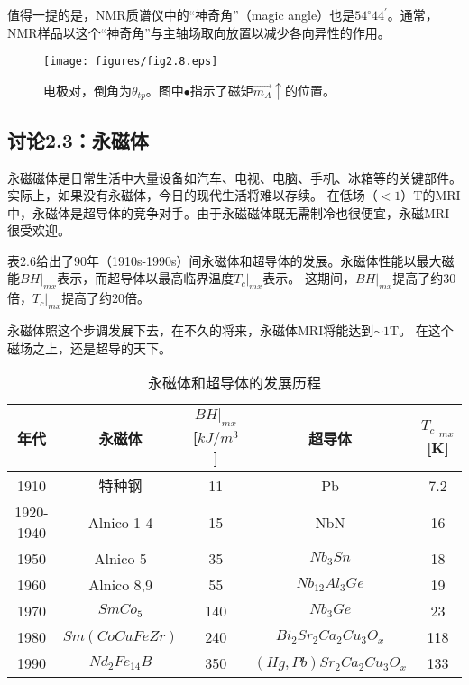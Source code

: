 值得一提的是，NMR质谱仪中的“神奇角”（magic angle）也是$54^\circ 44^\prime$。通常，NMR样品以这个“神奇角”与主轴场取向放置以减少各向异性的作用。

\begin{figure}
  \centering
 \texttt{[image: figures/fig2.8.eps]}
  \caption{电极对，倒角为$\theta_{tp}$。图中$\bullet$指示了磁矩$\vec{m_A}\uparrow$的位置。}
\end{figure}

\subsection{讨论2.3：永磁体}
永磁磁体是日常生活中大量设备如汽车、电视、电脑、手机、冰箱等的关键部件。实际上，如果没有永磁体，今日的现代生活将难以存续。
在低场（$<1$）T的MRI中，永磁体是超导体的竞争对手。由于永磁磁体既无需制冷也很便宜，永磁MRI很受欢迎。

表2.6给出了90年（1910s-1990s）间永磁体和超导体的发展。永磁体性能以最大磁能$BH|_{mx}$表示，而超导体以最高临界温度$T_c|_{mx}$表示。
这期间，$BH|_{mx}$提高了约30倍，$T_c|_{mx}$提高了约20倍。

永磁体照这个步调发展下去，在不久的将来，永磁体MRI将能达到$\sim 1$T。
在这个磁场之上，还是超导的天下。

\begin{table}[]
\centering
\caption{永磁体和超导体的发展历程}
\label{磁体和超导体的发展}
\begin{tabular}{|c|c|c|c|c|}
\hline
年代        & 永磁体 & $BH|_{mx}$[$kJ/m^3$] & 超导体 & $T_c|_{mx}$[K]   \\ \hline
1910      &  特种钢   & 11       &  Pb   & 7.2 \\ \hline
1920-1940 &  Alnico 1-4   & 15       &   NbN  & 16  \\ \hline
1950      &   Alnico 5  & 35       &    $Nb_3 Sn$ & 18  \\ \hline
1960      &   Alnico 8,9  & 55       &   $Nb_{12}Al_3 Ge$  &   19  \\ \hline
1970      &   $SmCo_5 $  & 140      &  $Nb_3Ge$   & 23    \\ \hline
1980      &   $Sm(CoCuFeZr)  $& 240      &  $Bi_2 Sr_2 Ca_2 Cu_3 O_x$   & 118 \\ \hline
1990      &  $Nd_2Fe_{14}B$   & 350      & $(Hg, Pb) Sr_2 Ca_2 Cu_3 O_x$    & 133 \\ \hline
\end{tabular}
\end{table}



